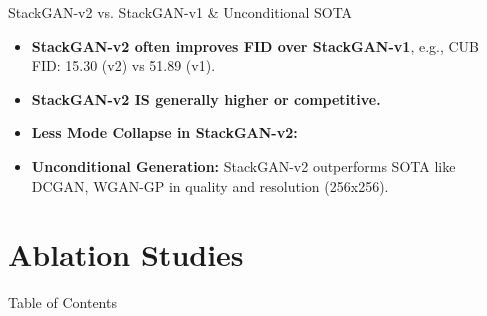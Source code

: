 \documentclass{beamer}
\newcommand{\paperfigure}[3][width=\textwidth]{%
    \begin{figure}%
        \centering%
        \texttt{[image: figures/\#2.png]}%
        \caption{#3 (Source:~\cite{stackgan++})}%
    \end{figure}%
}
\begin{document}
\begin{frame}{StackGAN-v2 vs. StackGAN-v1 \& Unconditional SOTA}
    \begin{itemize}
        \item \textbf{StackGAN-v2 often improves FID over StackGAN-v1}, e.g., CUB FID: 15.30 (v2) vs 51.89 (v1).
        \item \textbf{StackGAN-v2 IS generally higher or competitive.}
        \item \textbf{Less Mode Collapse in StackGAN-v2:}
    \end{itemize}
    \begin{itemize}
        \item \textbf{Unconditional Generation:} StackGAN-v2 outperforms SOTA like DCGAN, WGAN-GP in quality and resolution (256x256).
    \end{itemize}
\end{frame}

\section{Ablation Studies}
\begin{frame}{Table of Contents}
    \tableofcontents[currentsection]
\end{frame}
\end{document}
